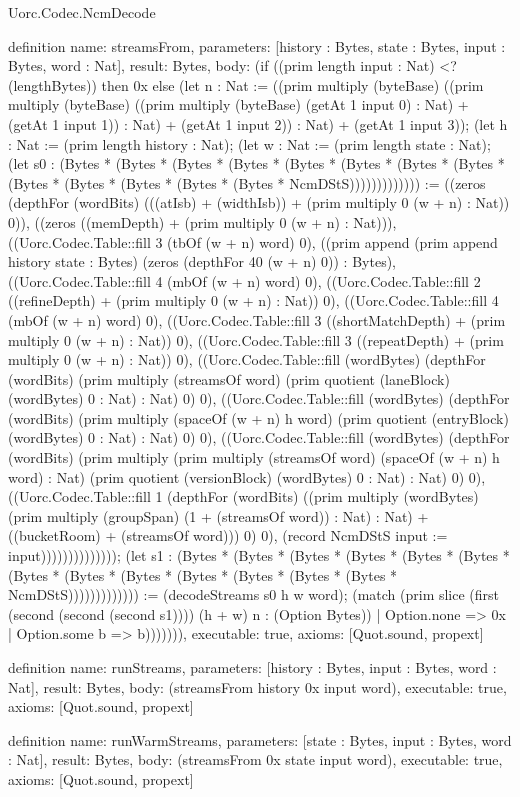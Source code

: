 \begin{lexlean}{Uorc.Codec.NcmDecode}
\begin{semanticmodule}
definition{
  name: streamsFrom,
  parameters: [history : Bytes, state : Bytes, input : Bytes, word : Nat],
  result: Bytes,
  body: (if ((prim length input : Nat) <? (lengthBytes)) then 0x else (let n : Nat := ((prim multiply (byteBase) ((prim multiply (byteBase) ((prim multiply (byteBase) (getAt 1 input 0) : Nat) + (getAt 1 input 1)) : Nat) + (getAt 1 input 2)) : Nat) + (getAt 1 input 3)); (let h : Nat := (prim length history : Nat); (let w : Nat := (prim length state : Nat); (let s0 : (Bytes * (Bytes * (Bytes * (Bytes * (Bytes * (Bytes * (Bytes * (Bytes * (Bytes * (Bytes * (Bytes * (Bytes * (Bytes * NcmDStS))))))))))))) := ((zeros (depthFor (wordBits) (((atIsb) + (widthIsb)) + (prim multiply 0 (w + n) : Nat)) 0)), ((zeros ((memDepth) + (prim multiply 0 (w + n) : Nat))), ((Uorc.Codec.Table::fill 3 (tbOf (w + n) word) 0), ((prim append (prim append history state : Bytes) (zeros (depthFor 40 (w + n) 0)) : Bytes), ((Uorc.Codec.Table::fill 4 (mbOf (w + n) word) 0), ((Uorc.Codec.Table::fill 2 ((refineDepth) + (prim multiply 0 (w + n) : Nat)) 0), ((Uorc.Codec.Table::fill 4 (mbOf (w + n) word) 0), ((Uorc.Codec.Table::fill 3 ((shortMatchDepth) + (prim multiply 0 (w + n) : Nat)) 0), ((Uorc.Codec.Table::fill 3 ((repeatDepth) + (prim multiply 0 (w + n) : Nat)) 0), ((Uorc.Codec.Table::fill (wordBytes) (depthFor (wordBits) (prim multiply (streamsOf word) (prim quotient (laneBlock) (wordBytes) 0 : Nat) : Nat) 0) 0), ((Uorc.Codec.Table::fill (wordBytes) (depthFor (wordBits) (prim multiply (spaceOf (w + n) h word) (prim quotient (entryBlock) (wordBytes) 0 : Nat) : Nat) 0) 0), ((Uorc.Codec.Table::fill (wordBytes) (depthFor (wordBits) (prim multiply (prim multiply (streamsOf word) (spaceOf (w + n) h word) : Nat) (prim quotient (versionBlock) (wordBytes) 0 : Nat) : Nat) 0) 0), ((Uorc.Codec.Table::fill 1 (depthFor (wordBits) ((prim multiply (wordBytes) (prim multiply (groupSpan) (1 + (streamsOf word)) : Nat) : Nat) + ((bucketRoom) + (streamsOf word))) 0) 0), (record NcmDStS {input := input})))))))))))))); (let s1 : (Bytes * (Bytes * (Bytes * (Bytes * (Bytes * (Bytes * (Bytes * (Bytes * (Bytes * (Bytes * (Bytes * (Bytes * (Bytes * NcmDStS))))))))))))) := (decodeStreams s0 h w word); (match (prim slice (first (second (second (second s1)))) (h + w) n : (Option Bytes))
    | Option.none => 0x
    | Option.some b => b))))))),
  executable: true,
  axioms: [Quot.sound, propext]
}

definition{
  name: runStreams,
  parameters: [history : Bytes, input : Bytes, word : Nat],
  result: Bytes,
  body: (streamsFrom history 0x input word),
  executable: true,
  axioms: [Quot.sound, propext]
}

definition{
  name: runWarmStreams,
  parameters: [state : Bytes, input : Bytes, word : Nat],
  result: Bytes,
  body: (streamsFrom 0x state input word),
  executable: true,
  axioms: [Quot.sound, propext]
}
\end{semanticmodule}
\end{lexlean}
